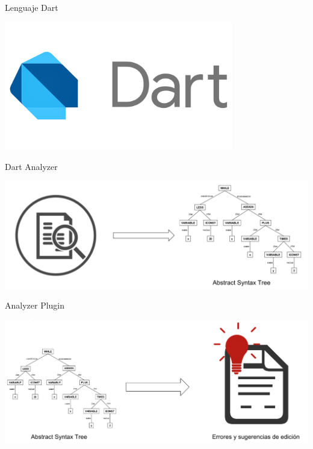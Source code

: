 \documentclass[aspectratio=169,10pt]{beamer}
\begin{document}
\begin{frame}[fragile]{Lenguaje Dart}
	\begin{center}
		\includegraphics[width=0.75\textwidth]{images/dart.png}
	\end{center}
\end{frame}

\begin{frame}[fragile]{Dart Analyzer}
	\begin{center}
		\includegraphics[width=1.0\textwidth]{images/ast.png}
	\end{center}
\end{frame}

\begin{frame}[fragile]{Analyzer Plugin}
		\begin{center}
      \includegraphics[width=1.0\textwidth]{images/plugin.png}
		\end{center}
\end{frame}
\end{document}
